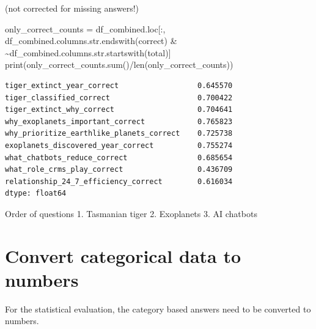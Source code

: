 \documentclass[
  letterpaper,
  DIV=11,
  numbers=noendperiod]{scrartcl}
\newenvironment{Shaded}{\begin{snugshade}}{\end{snugshade}}
\newcommand{\BuiltInTok}[1]{\textcolor[rgb]{0.00,0.23,0.31}{#1}}
\newcommand{\NormalTok}[1]{\textcolor[rgb]{0.00,0.23,0.31}{#1}}
\newcommand{\OperatorTok}[1]{\textcolor[rgb]{0.37,0.37,0.37}{#1}}
\newcommand{\StringTok}[1]{\textcolor[rgb]{0.13,0.47,0.30}{#1}}
\begin{document}
(not corrected for missing answers!)

\begin{Shaded}
\begin{Highlighting}[]
\NormalTok{only\_correct\_counts }\OperatorTok{=}\NormalTok{ df\_combined.loc[:, df\_combined.columns.}\BuiltInTok{str}\NormalTok{.endswith(}\StringTok{\textquotesingle{}correct\textquotesingle{}}\NormalTok{) }\OperatorTok{\&} \OperatorTok{\textasciitilde{}}\NormalTok{df\_combined.columns.}\BuiltInTok{str}\NormalTok{.startswith(}\StringTok{\textquotesingle{}total\textquotesingle{}}\NormalTok{)]}
\BuiltInTok{print}\NormalTok{(only\_correct\_counts.}\BuiltInTok{sum}\NormalTok{()}\OperatorTok{/}\BuiltInTok{len}\NormalTok{(only\_correct\_counts))}
\end{Highlighting}
\end{Shaded}

\begin{verbatim}
tiger_extinct_year_correct                  0.645570
tiger_classified_correct                    0.700422
tiger_extinct_why_correct                   0.704641
why_exoplanets_important_correct            0.765823
why_prioritize_earthlike_planets_correct    0.725738
exoplanets_discovered_year_correct          0.755274
what_chatbots_reduce_correct                0.685654
what_role_crms_play_correct                 0.436709
relationship_24_7_efficiency_correct        0.616034
dtype: float64
\end{verbatim}

Order of questions 1. Tasmanian tiger 2. Exoplanets 3. AI chatbots

\section{Convert categorical data to
numbers}\label{convert-categorical-data-to-numbers}

For the statistical evaluation, the category based answers need to be
converted to numbers.
\end{document}

